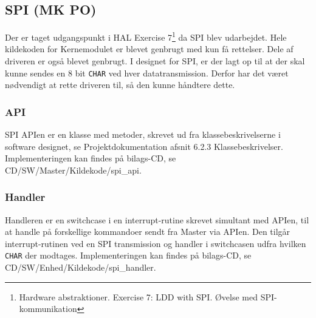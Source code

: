 \subsection{SPI (MK PO)}

Der er taget udgangspunkt i HAL Exercise 7\footnote{Hardware abstraktioner. Exercise 7: LDD with SPI. Øvelse med SPI-kommunikation} da SPI blev udarbejdet. Hele kildekoden for Kernemodulet er blevet genbrugt med kun få rettelser. Dele af driveren er også blevet genbrugt. I designet for SPI, er der lagt op til at der skal kunne sendes en 8 bit \verb+CHAR+ ved hver datatransmission. Derfor har det været nødvendigt at rette driveren til, så den kunne håndtere dette.

\subsubsection*{API}

SPI APIen er en klasse med metoder, skrevet ud fra klassebeskrivelserne i software designet, se Projektdokumentation afsnit 6.2.3 Klassebeskrivelser. Implementeringen kan findes på bilags-CD, se CD/SW/Master/Kildekode/spi\_api.

\subsubsection*{Handler}

Handleren er en switchcase i en interrupt-rutine skrevet simultant med APIen, til at handle på forskellige kommandoer sendt fra Master via APIen. Den tilgår interrupt-rutinen ved en SPI transmission og handler i switchcasen udfra hvilken \verb+CHAR+ der modtages. Implementeringen kan findes på bilags-CD, se CD/SW/Enhed/Kildekode/spi\_handler.